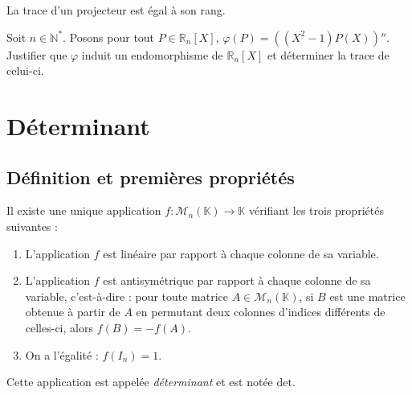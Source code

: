 \documentclass[a4paper,10pt]{report}
\begin{document}
\medskip

\begin{ex} La trace d'un projecteur est égal à son rang.

\vspace{5cm}
\medskip

\end{ex}

\begin{exa} Soit $n \in \mathbb{N}^*$. Posons pour tout $P \in \mathbb{R}_n[X]$, $\varphi(P) = ((X^2-1)P(X))''$. Justifier que $\varphi$ induit un endomorphisme de $\mathbb{R}_n[X]$ et déterminer la trace de celui-ci.
\end{exa}

\section{Déterminant}

\subsection{Définition et premières propriétés}

\begin{defin} Il existe une unique application $f : \mathcal{M}_n(\mathbb{K}) \rightarrow \mathbb{K}$ vérifiant les trois propriétés suivantes :

\begin{enumerate}
\item L'application $f$ est linéaire par rapport à chaque colonne de sa variable.
\item L'application $f$ est antisymétrique par rapport à chaque colonne de sa variable, c'est-à-dire : pour toute matrice $A \in \mathcal{M}_n(\mathbb{K})$, si $B$ est une matrice obtenue à partir de $A$ en permutant deux colonnes d'indices différents de celles-ci, alors $f(B)=-f(A)$.
\item On a l'égalité : $f(I_n)=1$.
\end{enumerate}

\noindent Cette application est appelée \textit{déterminant} et est notée $\textrm{det}$.
\end{defin}
\end{document}
